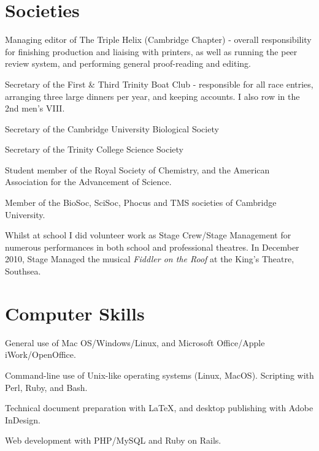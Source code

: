\documentclass[letterpaper]{article}
\renewenvironment{itemize}{
  \begin{list}{}{
    \setlength{\leftmargin}{1.5em}
  }
}{
  \end{list}
}
\begin{document}
\section*{Societies}
\begin{itemize}
	\item Managing editor of The Triple Helix (Cambridge Chapter) - overall responsibility for finishing production and liaising with printers, as well as running the peer review system, and performing general proof-reading and editing.
	\item Secretary of the First \& Third Trinity Boat Club - responsible for all race entries, arranging three large dinners per year, and keeping accounts. I also row in the 2nd men's VIII.
	\item Secretary of the Cambridge University Biological Society
	\item Secretary of the Trinity College Science Society 
	\item Student member of the Royal Society of Chemistry, and the American Association for the Advancement of Science. 
	\item Member of the BioSoc, SciSoc, Phocus and TMS societies of Cambridge University.
	\item  Whilst at school I did volunteer work as Stage Crew/Stage Management for numerous performances in both school and professional theatres. In December 2010, Stage Managed the musical \textit{Fiddler on the Roof} at the King's Theatre, Southsea.
\end{itemize}

\section*{Computer Skills}
\begin{itemize}
\item General use of Mac OS/Windows/Linux, and Microsoft Office/Apple iWork/OpenOffice.
\item Command-line use of Unix-like operating systems (Linux, MacOS). Scripting with Perl, Ruby, and Bash.
\item Technical document preparation with \LaTeX, and desktop publishing with Adobe InDesign.
\item Web development with PHP/MySQL and Ruby on Rails.
\end{itemize}
\end{document}
